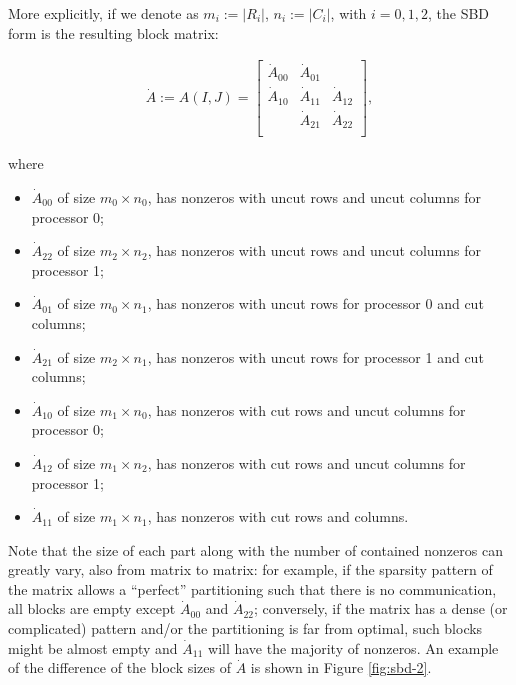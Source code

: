 More explicitly, if we denote as $m_i := |R_i|$, $n_i := |C_i|$, with $i=0,1,2$, the SBD form is the resulting block matrix:

\begin{align}\dot{A} := A(I,J) = 
	\begin{bmatrix}
		\dot{A}_{00} & \dot{A}_{01}  & \\
		\dot{A}_{10} & \dot{A}_{11} & \dot{A}_{12} \\
		& \dot{A}_{21} & \dot{A}_{22} \\ 
	\end{bmatrix}, \label{eq:sbd}
\end{align}

where

\begin{itemize}
	\item $\dot{A}_{00}$ of size $m_0 \times n_0$, has nonzeros with uncut rows and uncut columns for processor 0;
	\item $\dot{A}_{22}$ of size $m_2 \times n_2$, has nonzeros with uncut rows and uncut columns for processor 1;
	\item $\dot{A}_{01}$ of size $m_0 \times n_1$, has nonzeros with uncut rows for processor 0 and cut columns;
	\item $\dot{A}_{21}$ of size $m_2 \times n_1$, has nonzeros with uncut rows for processor 1 and cut columns;
	\item $\dot{A}_{10}$ of size $m_1 \times n_0$, has nonzeros with cut rows and uncut columns for processor 0;
	\item $\dot{A}_{12}$ of size $m_1 \times n_2$, has nonzeros with cut rows and uncut columns for processor 1;
	\item $\dot{A}_{11}$ of size $m_1 \times n_1$, has nonzeros with cut rows and columns.
\end{itemize}

Note that the size of each part along with the number of contained nonzeros can greatly vary, also from matrix to matrix: for example, if the sparsity pattern of the matrix allows a ``perfect'' partitioning such that there is no communication, all blocks are empty except $\dot{A}_{00}$ and $\dot{A}_{22}$; conversely, if the matrix has a dense (or complicated) pattern and/or the partitioning is far from optimal, such blocks might be almost empty and $\dot{A}_{11}$ will have the majority of nonzeros. An example of the difference of the block sizes of $\dot{A}$ is shown in Figure \ref{fig:sbd-2}.

